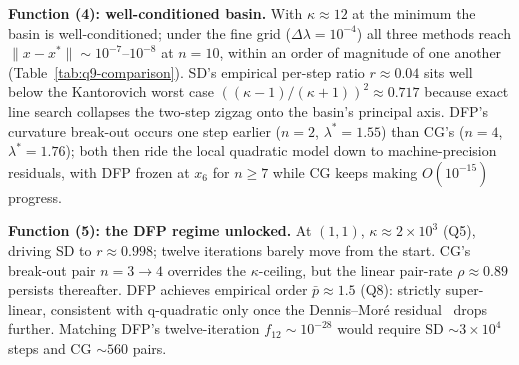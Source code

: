 \documentclass[11pt,a4paper]{article}
\begin{document}
\textbf{Function (4): well-conditioned basin.}
With \(\kappa\approx 12\) at the minimum the basin is well-conditioned; under the fine grid (\(\Delta\lambda=10^{-4}\)) all three methods reach \(\|x-x^{\ast}\|\sim 10^{-7}\)--\(10^{-8}\) at \(n=10\), within an order of magnitude of one another (Table~\ref{tab:q9-comparison}). SD's empirical per-step ratio \(r\approx 0.04\) sits well below the Kantorovich worst case \(((\kappa-1)/(\kappa+1))^{2}\approx 0.717\) because exact line search collapses the two-step zigzag onto the basin's principal axis. DFP's curvature break-out occurs one step earlier (\(n=2\), \(\lambda^{\ast}=1.55\)) than CG's (\(n=4\), \(\lambda^{\ast}=1.76\)); both then ride the local quadratic model down to machine-precision residuals, with DFP frozen at \(x_{6}\) for \(n\ge 7\) while CG keeps making \(O(10^{-15})\) progress.

\textbf{Function (5): the DFP regime unlocked.}
At \((1,1)\), \(\kappa\approx 2\!\times\!10^{3}\) (Q5), driving SD to \(r\approx 0.998\); twelve iterations barely move from the start. CG's break-out pair \(n=3\to 4\) overrides the \(\kappa\)-ceiling, but the linear pair-rate \(\rho\approx 0.89\) persists thereafter. DFP achieves empirical order \(\bar p\approx 1.5\) (Q8): strictly super-linear, consistent with q-quadratic only once the Dennis--Mor\'e residual~\cite{dennis-more} drops further. Matching DFP's twelve-iteration \(f_{12}\!\sim\!10^{-28}\) would require SD \(\sim 3\!\times\!10^{4}\) steps and CG \(\sim 560\) pairs.
\end{document}
